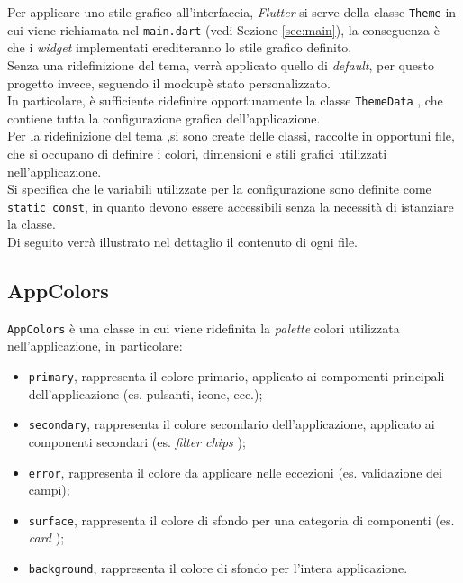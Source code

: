 Per applicare uno stile grafico all'interfaccia, \emph{Flutter} \cite{site:flutter} si serve della classe \lstinline{Theme} \cite{site:theme-class} in cui viene richiamata nel \lstinline{main.dart} (vedi Sezione \ref{sec:main}), la conseguenza è che i \emph{widget} implementati erediteranno lo stile grafico definito. \\
Senza una ridefinizione del tema, verrà applicato quello di \emph{default}, per questo progetto invece, seguendo il \gls{mockup}\glsoccur è stato personalizzato. \\
In particolare, è sufficiente ridefinire opportunamente la classe \lstinline{ThemeData} \cite{site:theme-data-class}, che contiene tutta la configurazione grafica dell'applicazione. \\
Per la ridefinizione del tema ,si sono create delle classi, raccolte in opportuni file, che si occupano di definire i colori, dimensioni e stili grafici utilizzati nell'applicazione. \\
Si specifica che le variabili utilizzate per la configurazione sono definite come \lstinline{static const}, in quanto devono essere accessibili senza la necessità di istanziare la classe. \\
Di seguito verrà illustrato nel dettaglio il contenuto di ogni file.

\subsection{AppColors}
\label{subsec:app-colors}

\lstinline{AppColors} è una classe in cui viene ridefinita la \emph{palette} colori utilizzata nell'applicazione, in particolare:
\begin{itemize}
    \item \lstinline{primary}, rappresenta il colore primario, applicato ai compomenti principali dell'applicazione (es. pulsanti, icone, ecc.);
    \item \lstinline{secondary}, rappresenta il colore secondario dell'applicazione, applicato ai componenti secondari (es. \emph{filter chips} \cite{site:chips});
    \item \lstinline{error}, rappresenta il colore da applicare nelle eccezioni (es. validazione dei campi);
    \item \lstinline{surface}, rappresenta il colore di sfondo per una categoria di componenti (es. \emph{card} \cite{site:card});
    \item \lstinline{background}, rappresenta il colore di sfondo per l'intera applicazione.
\end{itemize}

